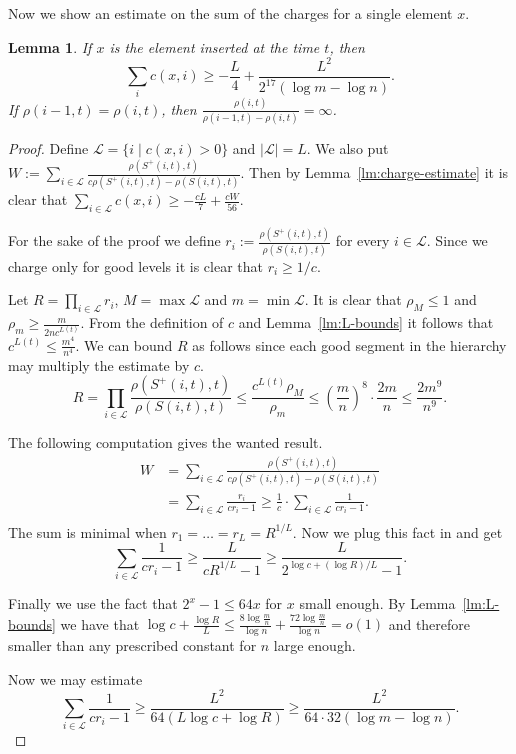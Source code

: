 \documentclass[11pt]{article} %
\newcommand{\density}[2]{\rho(#1, #2)}
\newcommand{\charge}[2]{c(#1, #2)}
\newcommand{\segment}[2]{S(#1, #2)}
\newcommand{\segmentt}[2]{S^+(#1, #2)}
\newtheorem{lemma}[definition]{Lemma}
\begin{document}
Now we show an estimate on the sum of the charges for a single element $x$.
\begin{lemma}
\label{lm:element-charge}
If $x$ is the element inserted at the time $t$, then
\[
\sum_{i} \charge{x}{i} \geq -\frac{L}{4} + \frac{L^2}{2^{17} (\log m - \log n)}.
\]
If $\density{i - 1}{t} = \density{i}{t}$, then $\frac{\density{i}{t}}{\density{i - 1}{t} - \density{i}{t}} = \infty$.
\end{lemma}
\begin{proof}
Define $\mathcal{L} = \{i \mid \charge{x}{i} > 0\}$ and $|\mathcal{L}| = L$.
We also put $W := \sum_{i \in \mathcal{L}} \frac{\density{\segmentt{i}{t}}{t}}{c\density{\segmentt{i}{t}}{t} - \density{\segment{i}{t}}{t}}$.
Then by Lemma~\ref{lm:charge-estimate} it is clear that $\sum_{i \in \mathcal{L}} \charge{x}{i} \geq -\frac{cL}{7} + \frac{cW}{56}$.

For the sake of the proof we define $r_i := \frac{\density{\segmentt{i}{t}}{t}}{\density{\segment{i}{t}}{t}}$ for every $i \in \mathcal{L}$.
Since we charge only for good levels it is clear that $r_i \geq 1/c$.

Let $R = \prod_{i\in\mathcal{L}} r_i$, $M = \max{\mathcal{L}}$ and $m = \min{\mathcal{L}}$.
It is clear that $\rho_M \leq 1$ and $\rho_{m} \geq \frac{m}{2nc^{L(t)}}$.
From the definition of $c$ and Lemma~\ref{lm:L-bounds} it follows that $c^{L(t)} \leq \frac{m^4}{n^4}$.
We can bound $R$ as follows since each good segment in the hierarchy may multiply the estimate by $c$.
\[
R = \prod_{i\in\mathcal{L}} \frac{\density{\segmentt{i}{t}}{t}}{\density{\segment{i}{t}}{t}} \leq \frac{c^{L(t)}\rho_M}{\rho_m} \leq \left(\frac{m}{n}\right)^8 \cdot \frac{2m}{n} \leq \frac{2m^9}{n^9}.
\]

The following computation gives the wanted result.
\[
\begin{split}
	W & = \sum_{i \in \mathcal{L}} \frac{\density{\segmentt{i}{t}}{t}}{c\density{\segmentt{i}{t}}{t} - \density{\segment{i}{t}}{t}} \\ 
	& = \sum_{i \in \mathcal{L}} \frac{r_i}{cr_i - 1} \geq \frac{1}{c} \cdot \sum_{i \in \mathcal{L}} \frac{1}{cr_i - 1}. \\
\end{split}
\]
The sum is minimal when $r_1 = \dots = r_L = R^{1 / L}$.
Now we plug this fact in and get
\[
\sum_{i \in \mathcal{L}} \frac{1}{cr_i - 1} \geq \frac{L}{cR^{1 / L} - 1} \geq \frac{L}{2^{\log c + (\log R)/L} - 1}.
\]

Finally we use the fact that $2^x - 1 \leq 64 x$ for $x$ small enough.
By Lemma~\ref{lm:L-bounds} we have that $\log c + \frac{\log R}{L} \leq \frac{8\log \frac{m}{n}}{\log n} + \frac{72 \log \frac{m}{n}}{\log n} = o(1)$ and therefore smaller than any prescribed constant for $n$ large enough.

Now we may estimate 
\[
\sum_{i \in \mathcal{L}} \frac{1}{cr_i - 1} \geq \frac{L^2}{64(L\log c + \log R)} \geq \frac{L^2}{64 \cdot 32 (\log m - \log n)}.
\]
\end{proof}
\end{document}
